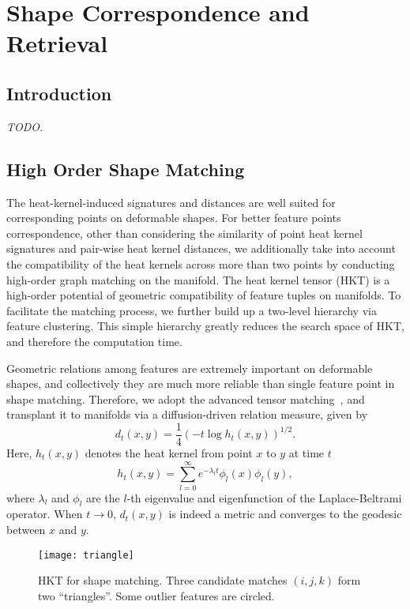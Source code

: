 \chapter{Shape Correspondence and Retrieval}
\section{Introduction}
\emph{TODO.}

\section{High Order Shape Matching}

The heat-kernel-induced signatures and distances are well suited for corresponding points on deformable shapes.
For better feature points correspondence, other than considering the similarity of point heat kernel signatures
and pair-wise heat kernel distances, we additionally take into account the compatibility of the heat kernels across
more than two points by conducting high-order graph matching on the manifold. The heat kernel tensor (HKT) is a
high-order potential of geometric compatibility of feature tuples on manifolds. To facilitate the matching process,
we further build up a two-level hierarchy via feature clustering. This simple hierarchy greatly reduces the search
space of HKT, and therefore the computation time.

Geometric relations among features are extremely important on deformable shapes, and collectively they are much
more reliable than single feature point in shape matching. Therefore, we adopt the advanced tensor
matching~\cite{Duchenne:CVPR:2011}, and transplant it to manifolds via a diffusion-driven relation measure, given by
\begin{equation}
d_{t}(x,y)=\frac{1}{4}(-t\log h_{t}(x,y))^{1/2}.
\end{equation}
Here, $h_t(x,y)$ denotes the heat kernel from point $x$ to $y$ at time $t$
\begin{equation}
h_t(x,y)=\sum_{l=0}^{\infty}e^{-\lambda_l t}\phi_l(x)\phi_l(y),
\end{equation}
where $\lambda_l$ and $\phi_l$ are the $l$-th eigenvalue and eigenfunction of the Laplace-Beltrami operator. When $t\to 0$, $d_{t}(x,y)$ is indeed a metric and converges to the geodesic between $x$ and $y$.

\begin{figure}
\centering
\texttt{[image: triangle]}
\caption[HKT for feature matching.]
{HKT for shape matching. Three candidate matches $(i,j,k)$ form two ``triangles''. Some outlier features are circled.}
\label{fig:triple}
\end{figure}

